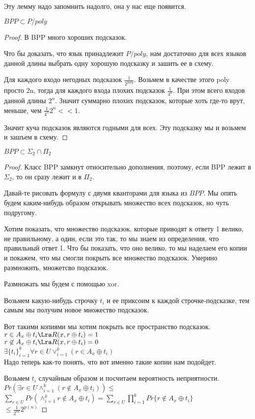 Эту лемму надо запомнить надолго, она у нас еще появится.

\begin{theorem}
$BPP \subset P/poly$\\
\end{theorem}
\begin{proof}
В BPP много хороших подсказок. 

Что бы доказать, что язык принадлежит $P/poly$, нам достаточно для всех языков 
данной длины выбрать одну хорошую подсказку и зашить ее в схему.

Для каждого входо негодных подсказок $\frac{1}{2^{poly}} $. Возьмем в качестве этого poly просто 2n, 
тогда для каждого входа плохих подсказок $\frac{1}{4^n}$. При этом всего входов данной длины $2^n$. Значит 
суммарно плохих подсказок, которые хоть где-то врут, меньше, чем $\frac{1}{4^n}2^n << 1$.

Значит куча подсказок являются годными для всех. Эту подсказку мы и возьмем и зашъем в схему.
\end{proof}

\begin {theorem}
$BPP \subset \Sigma_2 \cap \Pi_2$\\
\end{theorem}
\begin{proof}
Класс BPP замкнут относительно дополнения, поэтому, если BPP лежит в $\Sigma_2$, 
то он сразу лежит и в $\Pi_2$.

Давай-те рисовать формулу с двумя кванторами для языка из $BPP$. Мы опять будем каким-нибудь образом 
открывать множество всех подсказок, но чуть подругому. 

Хотим показать, что множество подсказок, которые приводят к ответу 1 велико, не правильному, а один, если это так, 
то мы знаем из определения, что правильный ответ 1. Что бы показать, 
что оно велико, то мы наделаем его копии и покажем, что мы смогли покрыть все множество подсказок. Умерино размножить,  множетсво подсказок. 

Размножать мы будем с помощью xor.

Возьмем какую-нибудь строчку $t_i$ и ее приксоим к каждой строчке-подсказке, тем самым
мы получим новое множество подсказок.

Вот такими копиями мы хотим покрыть все пространство подсказок.
$r \in A_x \oplus t_i \Lra R(x, r \oplus t_i) = 1$ \\
$r \not \in A_x \oplus t_i \Lra R(x, r \oplus t_i) = 0$\\

$\exists\{t_i\}_{i = 1}^{k} \forall r \in U \vee_{i = 1}^{k}(r \in A_x \oplus t_i)$ \\

Надо теперь как-то понять, что вот именно такие копии нам подойдет.

Возьмем $t_i$ случайным образом и посчитаем вероятность неприятности.
$Pr(\exists r\in U \wedge_{i = 1}^{k}(r \not \in A_x \oplus t_i)) \le$\\
$\sum_{r \in U}Pr(\wedge_{i = 1}^{k}r \not \in A_x \oplus t_i) = \sum_{r \in U} \prod_{i = 1}^{k}Pr\{r \not \in A_x \oplus t_i\}$\\
$\le \frac{1}{2^{nk}}2^{p(n)}$ 
\end{proof}


